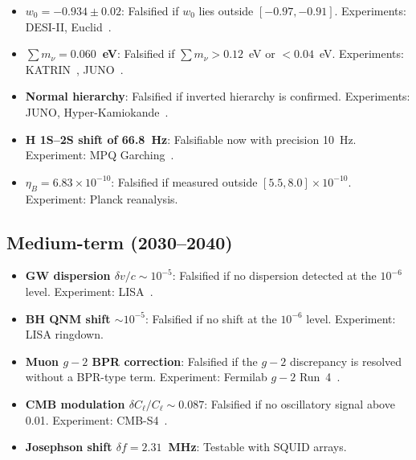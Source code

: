 \documentclass[aps,prd,twocolumn,superscriptaddress,longbibliography,nofootinbib]{revtex4-2}
\begin{document}
\begin{itemize}
\item \textbf{$w_0 = -0.934 \pm 0.02$}: Falsified if $w_0$ lies
  outside $[-0.97, -0.91]$.  Experiments: DESI-II,
  Euclid~\cite{Euclid2024}.

\item \textbf{$\sum m_\nu = 0.060$~eV}: Falsified if $\sum m_\nu
  > 0.12$~eV or $< 0.04$~eV.  Experiments: KATRIN~\cite{KATRIN2022},
  JUNO~\cite{JUNO2022}.

\item \textbf{Normal hierarchy}: Falsified if inverted hierarchy is
  confirmed.  Experiments: JUNO, Hyper-Kamiokande~\cite{HyperK2018}.

\item \textbf{H 1S--2S shift of 66.8~Hz}: Falsifiable now with
  precision 10~Hz.  Experiment: MPQ Garching~\cite{Parthey2011}.

\item \textbf{$\eta_B = 6.83 \times 10^{-10}$}: Falsified if
  measured outside $[5.5, 8.0] \times 10^{-10}$.  Experiment:
  Planck reanalysis.
\end{itemize}

\subsection{Medium-term (2030--2040)}

\begin{itemize}
\item \textbf{GW dispersion $\delta v/c \sim 10^{-5}$}: Falsified
  if no dispersion detected at the $10^{-6}$ level.  Experiment:
  LISA~\cite{LISA2023}.

\item \textbf{BH QNM shift $\sim 10^{-5}$}: Falsified if no
  shift at the $10^{-6}$ level.  Experiment: LISA ringdown.

\item \textbf{Muon $g-2$ BPR correction}: Falsified if the $g-2$
  discrepancy is resolved without a BPR-type term.  Experiment:
  Fermilab $g-2$ Run~4~\cite{FermilabG2}.

\item \textbf{CMB modulation $\delta C_\ell/C_\ell \sim 0.087$}:
  Falsified if no oscillatory signal above 0.01.  Experiment:
  CMB-S4~\cite{CMBS4}.

\item \textbf{Josephson shift $\delta f = 2.31$~MHz}: Testable with
  SQUID arrays.
\end{itemize}
\end{document}
